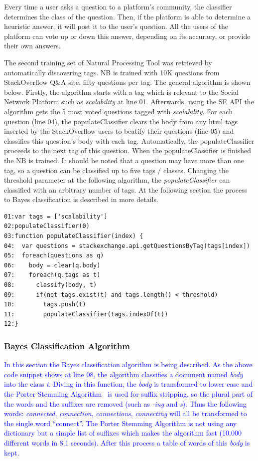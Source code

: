 Every time a user asks a question to a platform's community, the classifier determines the class of the question. Then, if the platform is able to determine a heuristic answer, it will post it to the user's question. All the users of the platform can vote up or down this answer, depending on its accuracy, or provide their own answers.

The second training set of Natural Processing Tool was retrieved by automatically discovering tags. NB is trained with 10K questions from StackOverflow Q\&A site, fifty questions per tag. The general algorithm is shown below. Firstly, the algorithm starts with a tag which is relevant to the Social Network Platform such as \emph{scalability} at line 01. Afterwards, using the SE API the algorithm gets the 5 most voted questions tagged with \emph{scalability}. For each question (line 04), the populateClassifier clears the body from any html tags inserted by the StackOverflow users to beatify their questions (line 05) and classifies this question's body with each tag. Automatically, the populateClassifier proceeds to the next tag of this question. When the populateClassifier is finished the NB is trained. It should be noted that a question may have more than one tag, so a question can be classified up to five tags / classes. Changing the threshold parameter at the following algorithm, the \emph{populateClassifier} can classified with an arbitrary number of tags. At the following section the process to Bayes classification is described in more details.

\begin{lstlisting} 
01:var tags = ['scalability']
02:populateClassifier(0)
03:function populateClassifier(index) {
04:  var questions = stackexchange.api.getQuestionsByTag(tags[index])
05:  foreach(questions as q)
06:    body = clear(q.body)
07:    foreach(q.tags as t)
08:    	 classify(body, t)
09:    	 if(not tags.exist(t) and tags.length() < threshold)
10:    	   tags.push(t)	  
11:        populateClassifier(tags.indexOf(t))
12:}		
\end{lstlisting}

\subsubsection{Bayes Classification Algorithm}
\textcolor{blue}{In this section the Bayes classification algorithm is being described. As the above code snippet shows at line 08, the algorithm classifies a document named \emph{body} into the class \emph{t}. Diving in this function, the \emph{body} is transformed to lower case and the Porter Stemming Algorithm~\citep{porter1980algorithm} is used for suffix stripping, so the plural part of the words and the suffixes are removed (such as \emph{-ing} and \emph{s}). Thus the following words: {\it connected}, {\it connection}, {\it connections}, {\it connecting} will all be transformed to the single word ``connect''. The Porter Stemming Algorithm is not using any dictionary but a simple list of suffixes which makes the algorithm fast (10.000 different words in 8.1 seconds). After this process a table of words of this \emph{body} is kept.}

